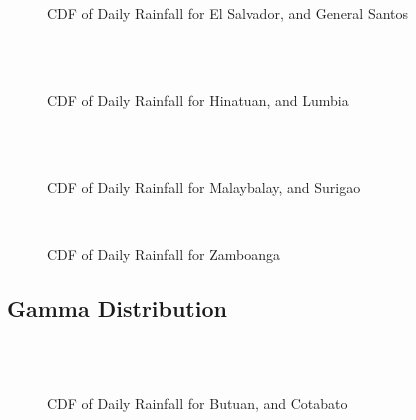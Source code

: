 \begin{figure}[H]
  \centering
  \\
  \\
  \caption{CDF of Daily Rainfall for El Salvador, and General Santos}
  \label{fig:weekly_without_threshold_appendix_gumbel_pt3}
\end{figure}

\begin{figure}[H]
  \centering
  \\
  \\
  \caption{CDF of Daily Rainfall for Hinatuan, and Lumbia}
  \label{fig:weekly_without_threshold_appendix_gumbel_pt4}
\end{figure}

\begin{figure}[H]
  \centering
  \\
  \\
  \caption{CDF of Daily Rainfall for Malaybalay, and Surigao}
  \label{fig:weekly_without_threshold_appendix_gumbel_pt5}
\end{figure}

\begin{figure}[H]
  \centering
  \\
  \caption{CDF of Daily Rainfall for Zamboanga}
  \label{fig:weekly_without_threshold_appendix_gumbel_pt6}
\end{figure}

\subsection{Gamma Distribution}

\begin{figure}[H]
  \centering
  \\
  \\
  \caption{CDF of Daily Rainfall for Butuan, and Cotabato}
  \label{fig:weekly_without_threshold_appendix_gamma_pt1}
\end{figure}

